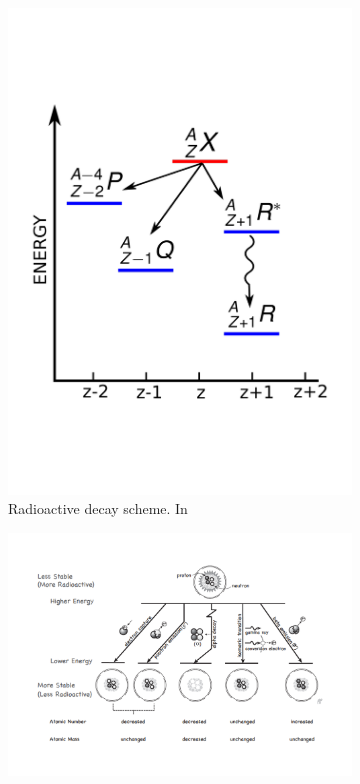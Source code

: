 \begin{figure}[!htbp]
\begin{subfigure}[t]{.35\textwidth}
\centering
\includegraphics[width=0.9\linewidth, trim={0 4cm 0 3cm}, clip]{03_GraphicFiles/chapter1_Introduction/decayScheme.pdf}
\caption{Radioactive decay scheme. In~\cite{Hendee2002}}
\label{chap1::fig::decayScheme}
\end{subfigure}
\begin{subfigure}[t]{.64\textwidth}
\centering
\includegraphics[width=0.98\linewidth]{03_GraphicFiles/chapter1_Introduction/decaySchematicSimple.pdf}

\end{subfigure}
\end{figure}
